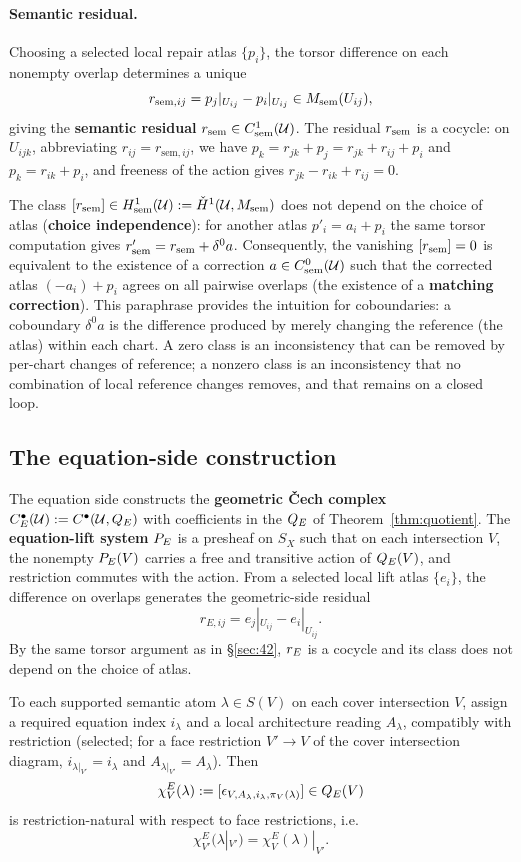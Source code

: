 \paragraph{Semantic residual.}
Choosing a selected local repair atlas $\{p_i\}$, the torsor difference
on each nonempty overlap determines a unique
\[
r_{\mathrm{sem},ij}=p_j|_{U_{ij}}-p_i|_{U_{ij}}\in M_{\mathrm{sem}}(U_{ij}),
\]
giving the \textbf{semantic residual} $r_{\mathrm{sem}}\in C^1_{\mathrm{sem}}(\mathcal{U})$.
The residual $r_{\mathrm{sem}}$ is a cocycle: on $U_{ijk}$, abbreviating
$r_{ij}=r_{\mathrm{sem},ij}$, we have
$p_k=r_{jk}+p_j=r_{jk}+r_{ij}+p_i$ and $p_k=r_{ik}+p_i$, and freeness of
the action gives $r_{jk}-r_{ik}+r_{ij}=0$.

The class $[r_{\mathrm{sem}}]\in
H^1_{\mathrm{sem}}(\mathcal{U}):=\check H^1(\mathcal{U},M_{\mathrm{sem}})$ does not depend on the
choice of atlas (\textbf{choice independence}): for another atlas
$p'_i=a_i+p_i$ the same torsor computation gives
$r'_{\mathrm{sem}}=r_{\mathrm{sem}}+\delta^0a$. Consequently, the vanishing
$[r_{\mathrm{sem}}]=0$ is equivalent to the existence of a correction
$a\in C^0_{\mathrm{sem}}(\mathcal{U})$ such that the corrected atlas
$(-a_i)+p_i$ agrees on all pairwise overlaps (the existence of a
\textbf{matching correction}). This paraphrase provides the intuition
for coboundaries: a coboundary $\delta^0a$ is the difference produced by
merely changing the reference (the atlas) within each chart. A zero
class is an inconsistency that can be removed by per-chart changes of
reference; a nonzero class is an inconsistency that no combination of
local reference changes removes, and that remains on a closed loop.

\subsection{The equation-side construction}\label{sec:43}

The equation side constructs the \textbf{geometric \v{C}ech complex}
$C^\bullet_E(\mathcal{U}):=C^\bullet(\mathcal{U},Q_{E})$ with coefficients in the $Q_{E}$ of
Theorem~\ref{thm:quotient}. The \textbf{equation-lift system} $P_{E}$ is a
presheaf on $S_X$ such that on each intersection $V$, the nonempty
$P_{E}(V)$ carries a free and transitive action of $Q_{E}(V)$, and
restriction commutes with the action. From a selected local lift atlas
$\{e_i\}$, the difference on overlaps generates the geometric-side
residual
\[
r_{E,ij}=e_j|_{U_{ij}}-e_i|_{U_{ij}}.
\]
By the same torsor argument as in \S\ref{sec:42}, $r_{E}$ is a cocycle and
its class does not depend on the choice of atlas.

\begin{proposition}\label{prop:chiE}
To each supported semantic atom $\lambda\in S(V)$ on each cover
intersection $V$, assign a required equation index $i_\lambda$ and a
local architecture reading $A_\lambda$, compatibly with restriction
(selected; for a face restriction $V'\to V$ of the cover intersection
diagram, $i_{\lambda|_{V'}}=i_\lambda$ and
$A_{\lambda|_{V'}}=A_\lambda$). Then
\[
\chi^E_V(\lambda):=[\epsilon_{V,A_\lambda,i_\lambda,\pi_V(\lambda)}]\in Q_{E}(V)
\]
is restriction-natural with respect to face restrictions, i.e.
\[
\chi^E_{V'}(\lambda|_{V'})=\chi^E_V(\lambda)|_{V'}.
\]
\end{proposition}


